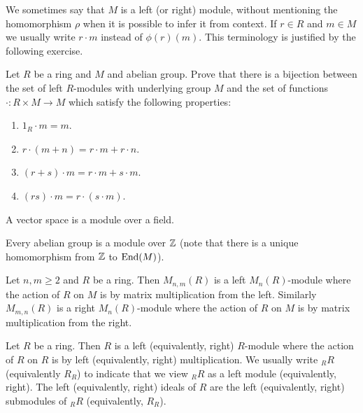 \documentclass[11pt,a4paper]{article}
\begin{document}
\begin{remark}
  We sometimes say that $M$ is a left (or right) module,
  without mentioning the homomorphism $\rho$ when it is possible to infer
  it from context.
  If $r \in R$ and $m \in M$ we usually write $r \cdot m$ instead
  of $\phi(r)(m)$.
  This terminology is justified by the following exercise.
\end{remark}

\begin{exercise}
  Let $R$ be a ring and $M$ and abelian group.
  Prove that there is a bijection between the set of left $R$-modules
  with underlying group $M$ and the set of
  functions $\cdot \colon R \times M \to M$ which satisfy the following
  properties:
  \begin{enumerate}
    \item[(1)] $1_R \cdot m = m$.
    \item[(2)] $r \cdot (m + n) = r \cdot m + r \cdot n$.
    \item[(3)] $(r + s) \cdot m = r \cdot m + s \cdot m$.
    \item[(4)] $(rs) \cdot m = r \cdot (s \cdot m)$.
  \end{enumerate}
\end{exercise}

\begin{example}
  A vector space is a module over a field.
\end{example}

\begin{example}
  Every abelian group is a module over $\mathbb{Z}$
  (note that there is a unique homomorphism from $\mathbb{Z}$ to $\operatorname{End}(M)$).
\end{example}

\begin{example}
  Let $n,m \geq 2$ and $R$ be a ring.
  Then $M_{n,m}(R)$ is a left $M_n(R)$-module
  where the action of $R$ on $M$ is by matrix multiplication from the left.
  Similarly $M_{m,n}(R)$ is a right $M_n(R)$-module where the action of $R$
  on $M$ is by matrix multiplication from the right.
\end{example}

\begin{example}
  Let $R$ be a ring.
  Then $R$ is a left (equivalently, right) $R$-module where the action of $R$
  on $R$ is by left (equivalently, right) multiplication.
  We usually write $_R R$ (equivalently $R_R$) to indicate that we view
  $_R R$ as a left module (equivalently, right).
  The left (equivalently, right) ideals of $R$ are the left (equivalently, right) submodules
  of $_R R$ (equivalently, $R_R$).
\end{example}
\end{document}
